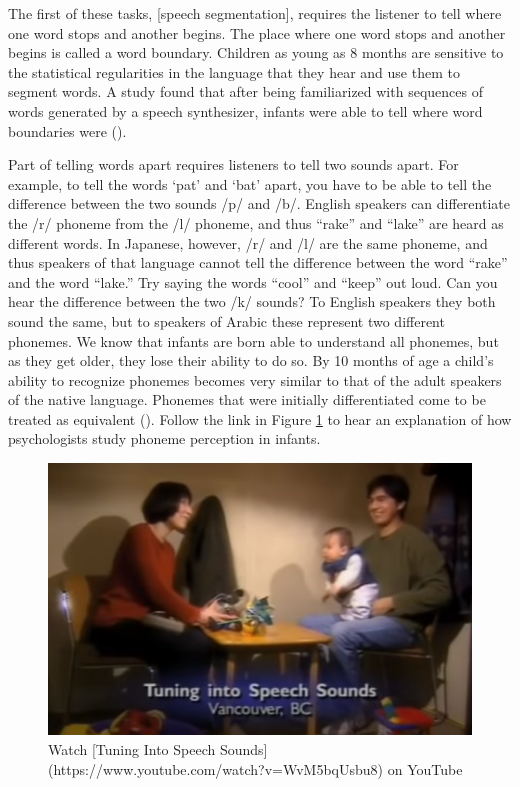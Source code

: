 \documentclass[
]{krantz}
\begin{document}
The first of these tasks, {[}speech segmentation{]}, requires the listener to tell where one word stops and another begins. The place where one word stops and another begins is called a word boundary. Children as young as 8 months are sensitive to the statistical regularities in the language that they hear and use them to segment words. A study found that after being familiarized with sequences of words generated by a speech synthesizer, infants were able to tell where word boundaries were ().

Part of telling words apart requires listeners to tell two sounds apart. For example, to tell the words `pat' and `bat' apart, you have to be able to tell the difference between the two sounds /p/ and /b/. English speakers can differentiate the /r/ phoneme from the /l/ phoneme, and thus ``rake'' and ``lake'' are heard as different words. In Japanese, however, /r/ and /l/ are the same phoneme, and thus speakers of that language cannot tell the difference between the word ``rake'' and the word ``lake.'' Try saying the words ``cool'' and ``keep'' out loud. Can you hear the difference between the two /k/ sounds? To English speakers they both sound the same, but to speakers of Arabic these represent two different phonemes. We know that infants are born able to understand all phonemes, but as they get older, they lose their ability to do so. By 10 months of age a child's ability to recognize phonemes becomes very similar to that of the adult speakers of the native language. Phonemes that were initially differentiated come to be treated as equivalent (). Follow the link in Figure \ref{fig:speechsounds} to hear an explanation of how psychologists study phoneme perception in infants.

\begin{figure}

{\centering \includegraphics[width=0.5\linewidth]{images/ch8/tuning_into_speech_sounds} 

}

\caption{Watch [Tuning Into Speech Sounds](https://www.youtube.com/watch?v=WvM5bqUsbu8) on YouTube}\label{fig:speechsounds}
\end{figure}
\end{document}
